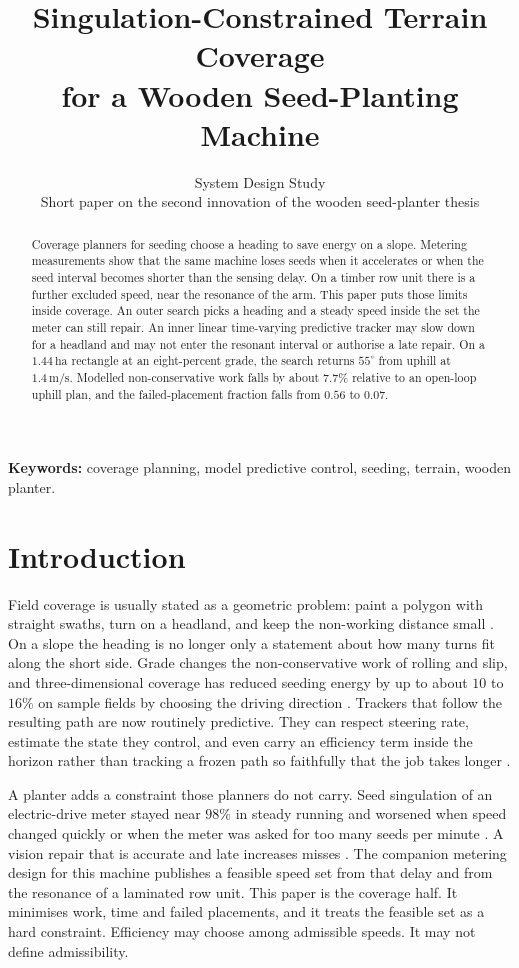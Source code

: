 \documentclass[11pt,a4paper]{article}
\title{Singulation-Constrained Terrain Coverage\\for a Wooden Seed-Planting Machine}
\author{System Design Study\\[0.3em]
\large Short paper on the second innovation of the wooden seed-planter thesis}
\date{}
\begin{document}
\maketitle

\begin{abstract}
Coverage planners for seeding choose a heading to save energy on a slope. Metering measurements show that the same machine loses seeds when it accelerates or when the seed interval becomes shorter than the sensing delay. On a timber row unit there is a further excluded speed, near the resonance of the arm. This paper puts those limits inside coverage. An outer search picks a heading and a steady speed inside the set the meter can still repair. An inner linear time-varying predictive tracker may slow down for a headland and may not enter the resonant interval or authorise a late repair. On a \(1.44\,\mathrm{ha}\) rectangle at an eight-percent grade, the search returns \(55^\circ\) from uphill at \(1.4\,\mathrm{m/s}\). Modelled non-conservative work falls by about \(7.7\%\) relative to an open-loop uphill plan, and the failed-placement fraction falls from \(0.56\) to \(0.07\).
\end{abstract}

\noindent\textbf{Keywords:} coverage planning, model predictive control, seeding, terrain, wooden planter.

\section{Introduction}
Field coverage is usually stated as a geometric problem: paint a polygon with straight swaths, turn on a headland, and keep the non-working distance small \cite{choset2001,oksanen2009,bochtis2008}. On a slope the heading is no longer only a statement about how many turns fit along the short side. Grade changes the non-conservative work of rolling and slip, and three-dimensional coverage has reduced seeding energy by up to about \(10\) to \(16\%\) on sample fields by choosing the driving direction \cite{jin2011,vahdanjoo2023}. Trackers that follow the resulting path are now routinely predictive. They can respect steering rate, estimate the state they control, and even carry an efficiency term inside the horizon rather than tracking a frozen path so faithfully that the job takes longer \cite{backman2012,kraus2013,plessen2017,xu2022}.

A planter adds a constraint those planners do not carry. Seed singulation of an electric-drive meter stayed near \(98\%\) in steady running and worsened when speed changed quickly or when the meter was asked for too many seeds per minute \cite{mangus2017}. A vision repair that is accurate and late increases misses \cite{borja2021}. The companion metering design for this machine publishes a feasible speed set from that delay and from the resonance of a laminated row unit. This paper is the coverage half. It minimises work, time and failed placements, and it treats the feasible set as a hard constraint. Efficiency may choose among admissible speeds. It may not define admissibility.
\end{document}
